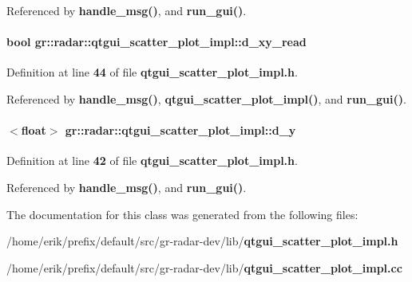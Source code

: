 Referenced by {\bf handle\+\_\+msg()}, and {\bf run\+\_\+gui()}.

\paragraph[{d\+\_\+xy\+\_\+read}]{\setlength{\rightskip}{0pt plus 5cm}bool gr\+::radar\+::qtgui\+\_\+scatter\+\_\+plot\+\_\+impl\+::d\+\_\+xy\+\_\+read}\label{classgr_1_1radar_1_1qtgui__scatter__plot__impl_a7526b12c6881fc4532d62a6af3fb0c05}


Definition at line {\bf 44} of file {\bf qtgui\+\_\+scatter\+\_\+plot\+\_\+impl.\+h}.



Referenced by {\bf handle\+\_\+msg()}, {\bf qtgui\+\_\+scatter\+\_\+plot\+\_\+impl()}, and {\bf run\+\_\+gui()}.

\paragraph[{d\+\_\+y}]{$<$float$>$ gr\+::radar\+::qtgui\+\_\+scatter\+\_\+plot\+\_\+impl\+::d\+\_\+y}\label{classgr_1_1radar_1_1qtgui__scatter__plot__impl_aa8ea490a33e9a918f9c168ed352cdf13}


Definition at line {\bf 42} of file {\bf qtgui\+\_\+scatter\+\_\+plot\+\_\+impl.\+h}.



Referenced by {\bf handle\+\_\+msg()}, and {\bf run\+\_\+gui()}.



The documentation for this class was generated from the following files\+:\begin{DoxyCompactItemize}
\item 
/home/erik/prefix/default/src/gr-\/radar-\/dev/lib/{\bf qtgui\+\_\+scatter\+\_\+plot\+\_\+impl.\+h}\item 
/home/erik/prefix/default/src/gr-\/radar-\/dev/lib/{\bf qtgui\+\_\+scatter\+\_\+plot\+\_\+impl.\+cc}\end{DoxyCompactItemize}

